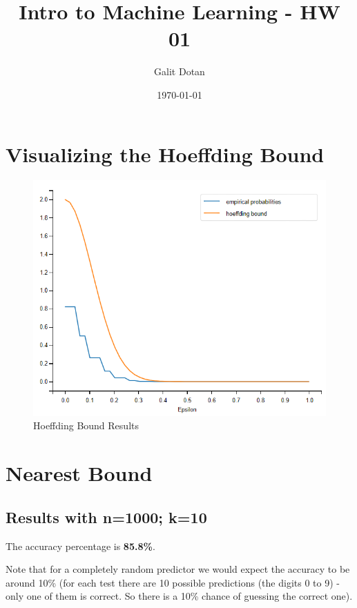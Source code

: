 \documentclass{article}
\title{Intro to Machine Learning - HW 01}
\author{Galit Dotan}
\date{\today}
\begin{document}
    \maketitle


    \section{Visualizing the Hoeffding Bound}\label{sec:visualizing-the-hoeffding-bound}

    \begin{figure}[htp]
        \centering
        \includegraphics{images/Hoeffding}
        \caption{\label{fig:hoeffding}Hoeffding Bound Results}
    \end{figure}

    \newpage


    \section{Nearest Bound}\label{sec:nearest-bound}

    \subsection{Results with n=1000; k=10}\label{subsec:results-with-n=1000;-k=10}

    The accuracy percentage is \textbf{85.8\%}.

    Note that for a completely random predictor we would expect the accuracy to be around 10\% (for each test there are 10 possible predictions (the digits 0 to 9) - only one of them is correct. So there is a 10\% chance of guessing the correct one).
\end{document}
